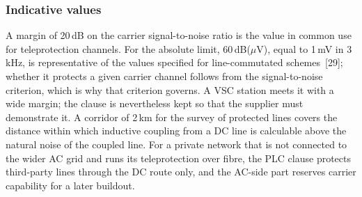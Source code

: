 \subsubsection{Indicative values}
A margin of 20\,dB on the carrier signal-to-noise ratio is the value in common
use for teleprotection channels. For the absolute limit, 60\,dB($\mu$V),
equal to 1\,mV in 3\,kHz, is representative of the values specified for
line-commutated schemes~[29]; whether it protects a given carrier channel
follows from the signal-to-noise criterion, which is why that criterion
governs. A VSC station meets it with a wide margin; the clause is nevertheless kept so
that the supplier must demonstrate it. A corridor of 2\,km for the survey of
protected lines covers the distance within which inductive coupling from a
DC line is calculable above the natural noise of the coupled line. For a
private network that is not connected to the wider AC grid and runs its
teleprotection over fibre, the PLC clause protects third-party lines through
the DC route only, and the AC-side part reserves carrier capability for a
later buildout.
\FloatBarrier
